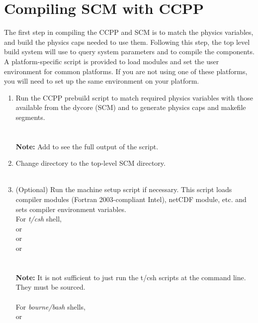 \section{Compiling SCM with CCPP}
\label{section: compiling}

The first step in compiling the CCPP and SCM is to match the physics variables, and build the physics caps needed to use them.  Following this step, the top level build system will use  to query system parameters and  to compile the components.  A platform-specific script is provided to load modules and set the user environment for common platforms.  If you are not using one of these platforms, you will need to set up the same environment on your platform.

\begin{enumerate}
	\item Run the CCPP prebuild script to match required physics variables with those available from the dycore (SCM) and to generate physics caps and makefile segments.\\
  		\\ \\
  	\textbf{Note:} Add  to see the full output of the script.\\ 
	\item Change directory to the top-level SCM directory.\\
  		 \\
	\item (Optional) Run the machine setup script if necessary. This script loads compiler modules (Fortran 2003-compliant Intel), netCDF module, etc. and sets compiler environment variables.  \\
For \textit{t/csh} shell, \\
  		 or\\
 		 or\\
		 or\\
		\\  \\
\textbf{Note:} It is not sufficient to just run the t/csh scripts at the command line. They must be sourced.  \\ \\
For \textit{bourne/bash} shells,\\
                  or\\

\end{enumerate}
